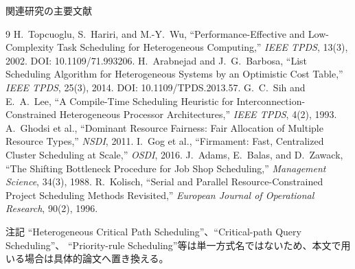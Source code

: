 \documentclass[aspectratio=169,10pt]{beamer}
\begin{document}
\begin{frame}{関連研究の主要文献}
  \tiny
  \begin{thebibliography}{9}
     H.~Topcuoglu, S.~Hariri, and M.-Y.~Wu,
      ``Performance-Effective and Low-Complexity Task Scheduling for Heterogeneous Computing,''
      \emph{IEEE TPDS}, 13(3), 2002. DOI: 10.1109/71.993206.
     H.~Arabnejad and J.~G.~Barbosa,
      ``List Scheduling Algorithm for Heterogeneous Systems by an Optimistic Cost Table,''
      \emph{IEEE TPDS}, 25(3), 2014. DOI: 10.1109/TPDS.2013.57.
     G.~C.~Sih and E.~A.~Lee,
      ``A Compile-Time Scheduling Heuristic for Interconnection-Constrained Heterogeneous Processor Architectures,''
      \emph{IEEE TPDS}, 4(2), 1993.
     A.~Ghodsi et al., ``Dominant Resource Fairness: Fair Allocation of Multiple Resource Types,''
      \emph{NSDI}, 2011.
     I.~Gog et al., ``Firmament: Fast, Centralized Cluster Scheduling at Scale,''
      \emph{OSDI}, 2016.
     J.~Adams, E.~Balas, and D.~Zawack,
      ``The Shifting Bottleneck Procedure for Job Shop Scheduling,'' \emph{Management Science}, 34(3), 1988.
     R.~Kolisch,
      ``Serial and Parallel Resource-Constrained Project Scheduling Methods Revisited,''
      \emph{European Journal of Operational Research}, 90(2), 1996.
  \end{thebibliography}
  \vspace{-2mm}
  \begin{alertblock}{注記}
    ``Heterogeneous Critical Path Scheduling''、``Critical-path Query Scheduling''、
    ``Priority-rule Scheduling''等は単一方式名ではないため、本文で用いる場合は具体的論文へ置き換える。
  \end{alertblock}
\end{frame}
\end{document}
